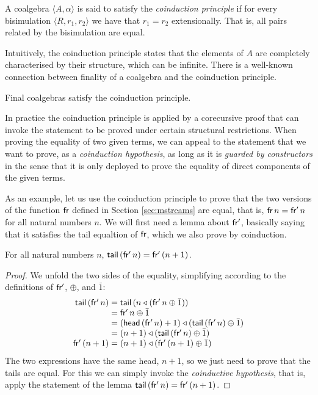 \begin{definition}\label{def:coinduction}
A coalgebra $\langle A,\alpha\rangle$ is said to satisfy the {\em coinduction principle} if for every bisimulation $\langle R,r_1,r_2\rangle$ we have that $r_1=r_2$ extensionally.
That is, all pairs related by the bisimulation are equal.
\end{definition}

Intuitively, the coinduction principle states that the elements of $A$ are completely characterised by their structure, which can be infinite.
There is a well-known connection between finality of a coalgebra and the coinduction principle.

\begin{theorem}\label{th:coinduction}
Final coalgebras satisfy the coinduction principle.
\end{theorem}

In practice the coinduction principle is applied by a corecursive proof that can invoke the statement to be proved under certain structural restrictions.
When proving the equality of two given terms, we can appeal to the statement that we want to prove, as a {\em coinduction hypothesis}, as long as it is {\em guarded by constructors} in the sense that it is only deployed to prove the equality of direct components of the given terms.

As an example, let us use the coinduction principle to prove that the two versions of the function $\mathsf{fr}$ defined in Section \ref{sec:mstreams} are equal,
that is, $\mathsf{fr}\,n = \mathsf{fr'}\,n$ for all natural numbers $n$.
We will first need a lemma about $\mathsf{fr'}$, basically saying that it satisfies the tail equaltion of $\mathsf{fr}$, which we also prove by coinduction.
\begin{lemma}\label{lemma:sfp}
For all natural numbers $n$, $\mathsf{tail}\,(\mathsf{fr'}\,n) = \mathsf{fr'}\,(n+1)$.
\end{lemma}
\begin{proof}
We unfold the two sides of the equality, simplifying according to the definitions of $\mathsf{fr'}$, $\oplus$, and $\bar{1}$:
$$
\begin{array}{r@{{}={}}l}
\tail\,(\sfp\,n)
& \tail\,(n \scons (\sfp\,n \oplus \bar{1}))\\
& \sfp\,n \oplus \bar{1}\\
& (\head\,(\sfp\,n) +1) \scons (\tail\,(\sfp\,n)  \oplus \bar{1})\\
& (n+1) \scons (\tail\,(\sfp\,n)  \oplus \bar{1})\\
\sfp\,(n+1)
& (n+1) \scons (\sfp\,(n+1) \oplus \bar{1})
\end{array}
$$
The two expressions have the same head, $n+1$, so we just need to prove that the tails are equal.
For this we can simply invoke the {\em coinductive hypothesis}, that is, apply the statement of the lemma $\mathsf{tail}\,(\mathsf{fr'}\,n) = \mathsf{fr'}\,(n+1)$.
\end{proof}

